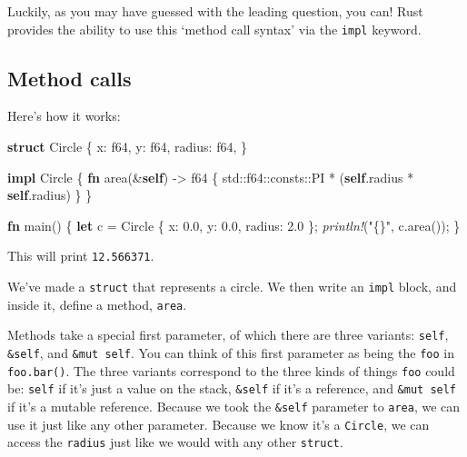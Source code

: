 \documentclass[a4paper,]{book}
\newenvironment{Shaded}{\begin{snugshade}}{\end{snugshade}}
\newcommand{\KeywordTok}[1]{\textcolor[rgb]{0.13,0.29,0.53}{\textbf{{#1}}}}
\newcommand{\DataTypeTok}[1]{\textcolor[rgb]{0.13,0.29,0.53}{{#1}}}
\newcommand{\DecValTok}[1]{\textcolor[rgb]{0.00,0.00,0.81}{{#1}}}
\newcommand{\StringTok}[1]{\textcolor[rgb]{0.31,0.60,0.02}{{#1}}}
\newcommand{\PreprocessorTok}[1]{\textcolor[rgb]{0.56,0.35,0.01}{\textit{{#1}}}}
\newcommand{\NormalTok}[1]{{#1}}
\begin{document}
Luckily, as you may have guessed with the leading question, you can!
Rust provides the ability to use this `method call syntax' via the
\texttt{impl} keyword.

\subsection{Method calls}\label{method-calls}

Here's how it works:

\begin{Shaded}
\begin{Highlighting}[]
\KeywordTok{struct} \NormalTok{Circle \{}
    \NormalTok{x: }\DataTypeTok{f64}\NormalTok{,}
    \NormalTok{y: }\DataTypeTok{f64}\NormalTok{,}
    \NormalTok{radius: }\DataTypeTok{f64}\NormalTok{,}
\NormalTok{\}}

\KeywordTok{impl} \NormalTok{Circle \{}
    \KeywordTok{fn} \NormalTok{area(&}\KeywordTok{self}\NormalTok{) -> }\DataTypeTok{f64} \NormalTok{\{}
        \NormalTok{std::}\DataTypeTok{f64}\NormalTok{::consts::PI * (}\KeywordTok{self}\NormalTok{.radius * }\KeywordTok{self}\NormalTok{.radius)}
    \NormalTok{\}}
\NormalTok{\}}

\KeywordTok{fn} \NormalTok{main() \{}
    \KeywordTok{let} \NormalTok{c = Circle \{ x: }\DecValTok{0.0}\NormalTok{, y: }\DecValTok{0.0}\NormalTok{, radius: }\DecValTok{2.0} \NormalTok{\};}
    \PreprocessorTok{println!}\NormalTok{(}\StringTok{"\{\}"}\NormalTok{, c.area());}
\NormalTok{\}}
\end{Highlighting}
\end{Shaded}

This will print \texttt{12.566371}.

We've made a \texttt{struct} that represents a circle. We then write an
\texttt{impl} block, and inside it, define a method, \texttt{area}.

Methods take a special first parameter, of which there are three
variants: \texttt{self}, \texttt{\&self}, and \texttt{\&mut\ self}. You
can think of this first parameter as being the \texttt{foo} in
\texttt{foo.bar()}. The three variants correspond to the three kinds of
things \texttt{foo} could be: \texttt{self} if it's just a value on the
stack, \texttt{\&self} if it's a reference, and \texttt{\&mut\ self} if
it's a mutable reference. Because we took the \texttt{\&self} parameter
to \texttt{area}, we can use it just like any other parameter. Because
we know it's a \texttt{Circle}, we can access the \texttt{radius} just
like we would with any other \texttt{struct}.
\end{document}
